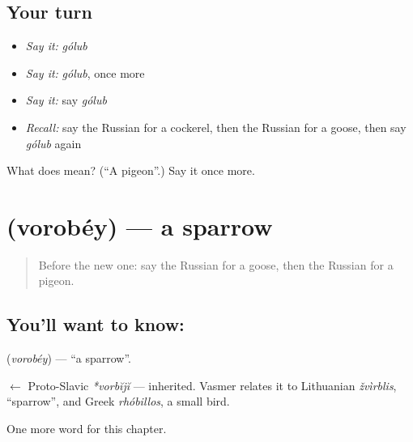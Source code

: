 \subsection*{Your turn}
\begin{itemize}
\raggedright
  \item \emph{Say it:} \emph{gólub}
  \item \emph{Say it:} \emph{gólub}, once more
  \item \emph{Say it:} say \emph{gólub}
  \item \emph{Recall:} say the Russian for a cockerel, then the Russian for a goose, then say \emph{gólub} again
\end{itemize}

\begin{tcolorbox}[breakable,colback=teal!4,colframe=teal!35!black,title={Before you move on}]
What does  mean? (\textquotedblleft{}A pigeon\textquotedblright{}.) Say it once more.
\end{tcolorbox}
\section[\texorpdfstring{\ru{воробей} (vorobéy)}{воробей (vorobéy)}]{ (vorobéy) — a sparrow}

\label{lesson:RU-C251-vorobey}



\begin{quote}
Before the new one: say the Russian for a goose, then the Russian for a pigeon.
\end{quote}

\subsection*{You'll want to know: }
\textbf{} (\emph{vorobéy}) — \textquotedblleft{}a sparrow\textquotedblright{}.

\begin{cousinweb}
\textbf{} $\leftarrow$ Proto-Slavic \emph{*vorbĭjĭ} — inherited. Vasmer relates it to Lithuanian \emph{žvìrblis}, \textquotedblleft{}sparrow\textquotedblright{}, and Greek \emph{rhóbillos}, a small bird.
\end{cousinweb}

\begin{grammarlens}[title={What you've built}]
One more word for this chapter.
\end{grammarlens}

